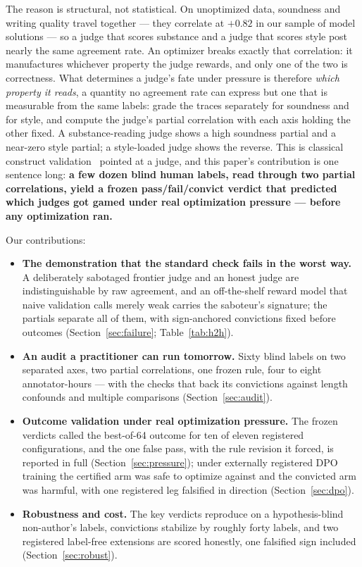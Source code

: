 \documentclass[11pt]{article}
\begin{document}
The reason is structural, not statistical.
On unoptimized data, soundness and writing quality travel together --- they correlate at $+0.82$ in our sample of model solutions --- so a judge that scores substance and a judge that scores style post nearly the same agreement rate.
An optimizer breaks exactly that correlation: it manufactures whichever property the judge rewards, and only one of the two is correctness.
What determines a judge's fate under pressure is therefore \emph{which property it reads}, a quantity no agreement rate can express but one that is measurable from the same labels: grade the traces separately for soundness and for style, and compute the judge's partial correlation with each axis holding the other fixed.
A substance-reading judge shows a high soundness partial and a near-zero style partial; a style-loaded judge shows the reverse.
This is classical construct validation~\cite{campbellfiske1959} pointed at a judge, and this paper's contribution is one sentence long: \textbf{a few dozen blind human labels, read through two partial correlations, yield a frozen pass/fail/convict verdict that predicted which judges got gamed under real optimization pressure --- before any optimization ran.}

Our contributions:
\begin{itemize}
\item \textbf{The demonstration that the standard check fails in the worst way.} A deliberately sabotaged frontier judge and an honest judge are indistinguishable by raw agreement, and an off-the-shelf reward model that naive validation calls merely weak carries the saboteur's signature; the partials separate all of them, with sign-anchored convictions fixed before outcomes (Section~\ref{sec:failure}; Table~\ref{tab:h2h}).
\item \textbf{An audit a practitioner can run tomorrow.} Sixty blind labels on two separated axes, two partial correlations, one frozen rule, four to eight annotator-hours --- with the checks that back its convictions against length confounds and multiple comparisons (Section~\ref{sec:audit}).
\item \textbf{Outcome validation under real optimization pressure.} The frozen verdicts called the best-of-64 outcome for ten of eleven registered configurations, and the one false pass, with the rule revision it forced, is reported in full (Section~\ref{sec:pressure}); under externally registered DPO training the certified arm was safe to optimize against and the convicted arm was harmful, with one registered leg falsified in direction (Section~\ref{sec:dpo}).
\item \textbf{Robustness and cost.} The key verdicts reproduce on a hypothesis-blind non-author's labels, convictions stabilize by roughly forty labels, and two registered label-free extensions are scored honestly, one falsified sign included (Section~\ref{sec:robust}).
\end{itemize}
\end{document}
